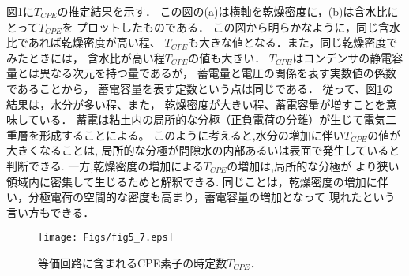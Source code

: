 図\ref{fig:fig5_7}に$T_{CPE}$の推定結果を示す．
この図の(a)は横軸を乾燥密度に，(b)は含水比にとって$T_{CPE}$を
プロットしたものである．
この図から明らかなように，同じ含水比であれば乾燥密度が高い程、
$T_{CPE}$も大きな値となる．また，同じ乾燥密度でみたときには，
含水比が高い程$T_{CPE}$の値も大きい．
$T_{CPE}$はコンデンサの静電容量とは異なる次元を持つ量であるが，
蓄電量と電圧の関係を表す実数値の係数であることから，
蓄電容量を表す定数という点は同じである．
従って、図\ref{fig:fig5_7}の結果は，水分が多い程、また，
乾燥密度が大きい程、蓄電容量が増すことを意味している．
蓄電は粘土内の局所的な分極（正負電荷の分離）が生じて電気二重層を形成することによる。
このように考えると,水分の増加に伴い$T_{CPE}$の値が大きくなることは,
局所的な分極が間隙水の内部あるいは表面で発生していると判断できる.
一方,乾燥密度の増加による$T_{CPE}$の増加は,局所的な分極が
より狭い領域内に密集して生じるためと解釈できる.
同じことは，乾燥密度の増加に伴い，分極電荷の空間的な密度も高まり，蓄電容量の増加となって
現れたという言い方もできる．\\
\begin{figure}[h]
	\begin{center}
	\texttt{[image: Figs/fig5\_7.eps]} 
	\end{center}
	\caption{
		等価回路に含まれるCPE素子の時定数$T_{CPE}$．
	} 
	\label{fig:fig5_7}
\end{figure}

